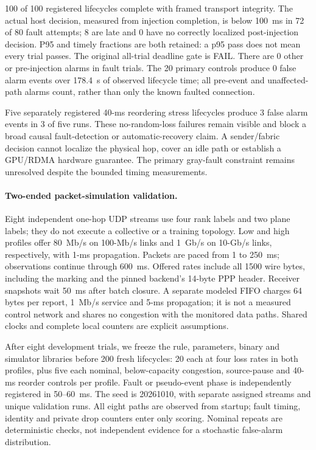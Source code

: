 \documentclass[sigconf]{acmart}
\begin{document}
100 of 100 registered lifecycles complete with framed transport
integrity. The actual host decision, measured from injection completion,
is below 100~ms in 72 of 80 fault attempts; 8 are late and
0 have no correctly localized post-injection decision. P95 and
timely fractions are both retained: a p95 pass does not mean every
trial passes. The original all-trial deadline gate is FAIL.
There are 0 other or pre-injection alarms in fault trials.
The 20 primary controls produce 0 false alarm events over
178.4~s of observed lifecycle time; all pre-event and unaffected-path
alarms count, rather than only the known faulted connection.

Five separately registered 40-ms reordering stress lifecycles produce
3 false alarm events in 3 of five runs.
These no-random-loss failures remain visible and block a broad causal
fault-detection or automatic-recovery claim. A sender/fabric decision
cannot localize the physical hop, cover an idle path or establish a
GPU/RDMA hardware guarantee. The primary gray-fault constraint remains
unresolved despite the bounded timing measurements.


\paragraph{Two-ended packet-simulation validation.}
Eight independent one-hop UDP streams use four rank labels and two
plane labels; they do not execute a collective or a training topology.
Low and high profiles offer 80~Mb/s on 100-Mb/s links and 1~Gb/s on
10-Gb/s links, respectively, with 1-ms propagation. Packets are paced
from 1 to 250~ms; observations continue through 600~ms. Offered rates
include all 1500 wire bytes, including the marking and the pinned
backend's 14-byte PPP header. Receiver snapshots wait 50~ms after
batch closure. A separate modeled FIFO charges 64 bytes per report,
1~Mb/s service and 5-ms propagation; it is not a measured control
network and shares no congestion with the monitored data paths.
Shared clocks and complete local counters are explicit assumptions.

After eight development trials, we freeze the rule, parameters,
binary and simulator libraries before 200 fresh lifecycles: 20 each
at four loss rates in both profiles, plus five each nominal,
below-capacity congestion, source-pause and 40-ms reorder controls per
profile. Fault or pseudo-event phase is independently registered in
50--60~ms. The seed is 20261010, with separate assigned streams and
unique validation runs. All eight paths are observed from startup;
fault timing, identity and private drop counters enter only scoring.
Nominal repeats are deterministic checks, not independent evidence
for a stochastic false-alarm distribution.
\end{document}
